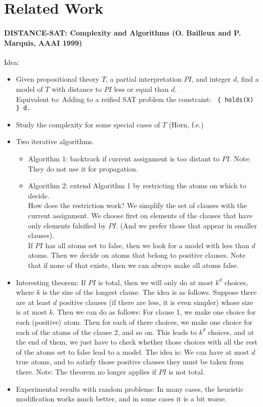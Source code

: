 
\section{Related Work}\label{sec:related}

\paragraph{DISTANCE-SAT: Complexity and Algorithms (O. Bailleux and P. Marquis, AAAI 1999)}

Idea:
\begin{itemize}
\item
    Given propositional theory $T$, a partial interpretation $PI$, and integer $d$, 
    find a model of $T$ with distance to $PI$ less or equal than $d$.
    \\
    Equivalent to: Adding to a reified SAT problem the constraint:
    \verb| { holds(X) } d.|
\item
    Study the complexity for some special cases of $T$ (Horn, f.e.)
\item
    Two iterative algorithms.
    \begin{itemize}
    \item
        Algorithm 1: backtrack if current assignment is too distant to $PI$. 
        Note: They do not use it for propagation.
    \item
        Algorithm 2: extend Algorithm 1 by restricting the atoms on which to decide.
        \\
        How does the restriction work? 
        We simplify the set of clauses with the current assignment.
        We choose first on elements of the clauses that have only elements falsified by $PI$.
        (And we prefer those that appear in smaller clauses).
        \\
        If $PI$ has all atoms set to false, then we look for a model with less than $d$ atoms.
        Then we decide on atoms that belong to positive clauses. 
        Note that if none of that exists, then we can always make all atoms false.
    \end{itemize}
\item
    Interesting theorem:
    If $PI$ is total, then we will only do at most $k^d$ choices, 
    where $k$ is the size of the longest clause.
    The idea is as follows. 
    Suppose there are at least $d$ positive clauses (if there are less, it is even simpler) whose size is at most $k$.
    Then we can do as follows:
    For clause 1, we make one choice for each (positive) atom. 
    Then for each of there choices, we make one choice for each of the atoms of the clause 2, and so on.
    This leads to $k^d$ choices, and at the end of them, 
    we just have to check whether those choices with all the rest of the atoms set to false lead to a model.
    The idea is: We can have at most $d$ true atoms, 
    and to satisfy those positive clauses they must be taken from there.
    Note: The theorem no longer applies if $PI$ is not total.
\item
    Experimental results with random problems:
    In many cases, the heuristic modification works much better, 
    and in some cases it is a bit worse.
\end{itemize}

